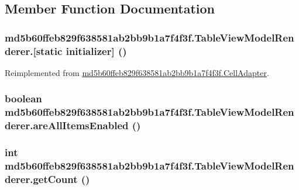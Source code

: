 \subsection{Member Function Documentation}
\hypertarget{classmd5b60ffeb829f638581ab2bb9b1a7f4f3f_1_1_table_view_model_renderer_887500bdde9d4ca81abdca920c56087c}{
\subsubsection[{[static initializer]}]{\setlength{\rightskip}{0pt plus 5cm}md5b60ffeb829f638581ab2bb9b1a7f4f3f.TableViewModelRenderer.\mbox{[}static initializer\mbox{]} ()}}
\label{classmd5b60ffeb829f638581ab2bb9b1a7f4f3f_1_1_table_view_model_renderer_887500bdde9d4ca81abdca920c56087c}




Reimplemented from \hyperlink{classmd5b60ffeb829f638581ab2bb9b1a7f4f3f_1_1_cell_adapter_c7c95358c7dafe01adfe68203283f13b}{md5b60ffeb829f638581ab2bb9b1a7f4f3f.CellAdapter}.\hypertarget{classmd5b60ffeb829f638581ab2bb9b1a7f4f3f_1_1_table_view_model_renderer_cd02c865f8a377a11fa054fa8269b8bc}{
\subsubsection[{areAllItemsEnabled}]{\setlength{\rightskip}{0pt plus 5cm}boolean md5b60ffeb829f638581ab2bb9b1a7f4f3f.TableViewModelRenderer.areAllItemsEnabled ()}}
\label{classmd5b60ffeb829f638581ab2bb9b1a7f4f3f_1_1_table_view_model_renderer_cd02c865f8a377a11fa054fa8269b8bc}


\hypertarget{classmd5b60ffeb829f638581ab2bb9b1a7f4f3f_1_1_table_view_model_renderer_3ee9ec4f5e214d15ca53d52792300f53}{
\subsubsection[{getCount}]{\setlength{\rightskip}{0pt plus 5cm}int md5b60ffeb829f638581ab2bb9b1a7f4f3f.TableViewModelRenderer.getCount ()}}
\label{classmd5b60ffeb829f638581ab2bb9b1a7f4f3f_1_1_table_view_model_renderer_3ee9ec4f5e214d15ca53d52792300f53}


